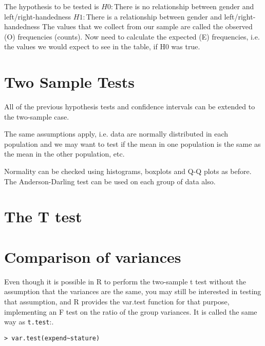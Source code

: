 The hypothesis to be tested is
$H0 :$There is no relationship between gender and left/right-handedness
$H1 :$There is a relationship between gender and left/right-handedness
 The values that we collect from our sample are called the observed
(O) frequencies (counts). Now need to calculate the expected (E)
frequencies, i.e. the values we would expect to see in the table, if
H0 was true.






\section{Two Sample Tests}


All of the previous hypothesis tests and confidence intervals can be
extended to the two-sample case.

The same assumptions apply, i.e. data are normally distributed in
each population and we may want to test if the mean in one
population is the same as the mean in the other population, etc.

Normality can be checked using histograms, boxplots and Q-Q
plots as before. The Anderson-Darling test can be used on
each group of data also.

\section{The T test}

\section{Comparison of variances}


Even though it is possible in R to perform the two-sample t test without
the assumption that the variances are the same, you may still be interested
in testing that assumption, and R provides the var.test function for that
purpose, implementing an F test on the ratio of the group variances. It is
called the same way as \texttt{t.test}:.
\begin{verbatim}
> var.test(expend~stature)
\end{verbatim}
